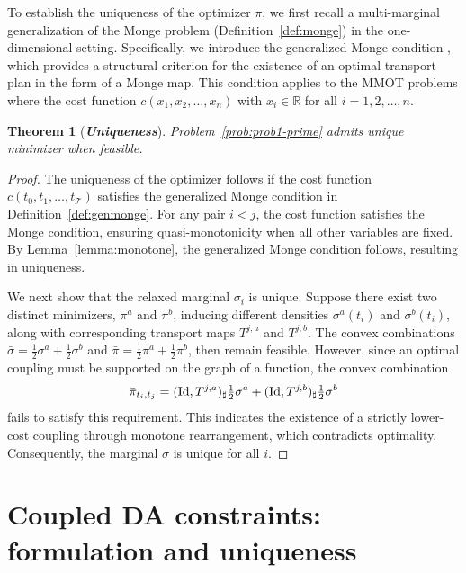 \documentclass[11pt]{article}
\newcommand{\calT}{{\mathcal T}}
\newtheorem{theorem}{Theorem}
\begin{document}
To establish the uniqueness of the optimizer $\pi$, we first recall a multi-marginal generalization of the Monge problem (Definition~\ref{def:monge}) in the one-dimensional setting. Specifically, we introduce the generalized Monge condition \cite[Page 24]{rachev1998mass}, which provides a structural criterion for the existence of an optimal transport plan in the form of a Monge map. This condition applies to the MMOT problems where the cost function $c(x_1, x_2, \dots, x_n)$ with $x_i \in \mathbb{R}$ for all $i=1,2,\dots,n$.

\begin{theorem}[\bf \textit{Uniqueness}]\label{thm:unique1-prime}
Problem~\ref{prob:prob1-prime} admits unique minimizer when feasible.
\end{theorem}

\begin{proof}
The uniqueness of the optimizer follows if the cost function $c(t_0,t_1,\dots,t_\calT)$ satisfies the generalized Monge condition in Definition~\ref{def:genmonge}. For any pair $i < j$, the cost function satisfies the Monge condition, ensuring quasi-monotonicity when all other variables are fixed. By Lemma~\ref{lemma:monotone}, the generalized Monge condition follows, resulting in uniqueness.

We next show that the relaxed marginal $\sigma_i$ is unique. Suppose there exist two distinct minimizers, $\pi^a$ and $\pi^b$, inducing different densities $\sigma^a(t_i)$ and $\sigma^b(t_i)$, along with corresponding transport maps $T^{j,a}$ and $T^{j,b}$. The convex combinations
$\bar \sigma = \frac{1}{2} \sigma^a + \frac{1}{2} \sigma^b$ and $\bar \pi = \frac{1}{2} \pi^a + \frac{1}{2} \pi^b
$, then remain feasible. However, since an optimal coupling must be supported on the graph of a function, the convex combination
$$
\bar \pi_{t_i, t_j} = ({\rm Id},  T^{j,a})_{\sharp}\tfrac{1}{2} \sigma^a +
({\rm Id},  T^{j,b})_{\sharp}\tfrac{1}{2} \sigma^b
$$
fails to satisfy this requirement. This indicates the existence of a strictly lower-cost coupling through monotone rearrangement, which contradicts optimality. Consequently, the marginal $\sigma$ is unique for all $i$.
\end{proof}



\section{Coupled DA constraints: formulation and uniqueness}\label{sec:couple}
\end{document}
